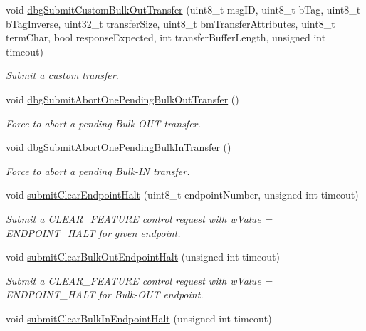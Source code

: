 \begin{DoxyCompactItemize}
void \hyperlink{classmdt_usbtmc_transfer_handler_a363680942d26a4f94cd710ca859f49cc}{dbg\-Submit\-Custom\-Bulk\-Out\-Transfer} (uint8\-\_\-t msg\-I\-D, uint8\-\_\-t b\-Tag, uint8\-\_\-t b\-Tag\-Inverse, uint32\-\_\-t transfer\-Size, uint8\-\_\-t bm\-Transfer\-Attributes, uint8\-\_\-t term\-Char, bool response\-Expected, int transfer\-Buffer\-Length, unsigned int timeout)
\begin{DoxyCompactList}\small\item\em Submit a custom transfer. \end{DoxyCompactList}\item 
void \hyperlink{classmdt_usbtmc_transfer_handler_a1e07eea684c9025f5c601daf25faa2a3}{dbg\-Submit\-Abort\-One\-Pending\-Bulk\-Out\-Transfer} ()
\begin{DoxyCompactList}\small\item\em Force to abort a pending Bulk-\/\-O\-U\-T transfer. \end{DoxyCompactList}\item 
void \hyperlink{classmdt_usbtmc_transfer_handler_addd4a2ec80bb1a1128f993b0fab47e4b}{dbg\-Submit\-Abort\-One\-Pending\-Bulk\-In\-Transfer} ()
\begin{DoxyCompactList}\small\item\em Force to abort a pending Bulk-\/\-I\-N transfer. \end{DoxyCompactList}\item 
void \hyperlink{classmdt_usbtmc_transfer_handler_a275d1b39ebd9391983e227cc51bc0879}{submit\-Clear\-Endpoint\-Halt} (uint8\-\_\-t endpoint\-Number, unsigned int timeout)
\begin{DoxyCompactList}\small\item\em Submit a C\-L\-E\-A\-R\-\_\-\-F\-E\-A\-T\-U\-R\-E control request with w\-Value = E\-N\-D\-P\-O\-I\-N\-T\-\_\-\-H\-A\-L\-T for given endpoint. \end{DoxyCompactList}\item 
void \hyperlink{classmdt_usbtmc_transfer_handler_adecd6b66a99d1a4d49802299ea465ff5}{submit\-Clear\-Bulk\-Out\-Endpoint\-Halt} (unsigned int timeout)
\begin{DoxyCompactList}\small\item\em Submit a C\-L\-E\-A\-R\-\_\-\-F\-E\-A\-T\-U\-R\-E control request with w\-Value = E\-N\-D\-P\-O\-I\-N\-T\-\_\-\-H\-A\-L\-T for Bulk-\/\-O\-U\-T endpoint. \end{DoxyCompactList}\item 
void \hyperlink{classmdt_usbtmc_transfer_handler_a0c75ed4ef7f3e216a1db8e8414fc896d}{submit\-Clear\-Bulk\-In\-Endpoint\-Halt} (unsigned int timeout)

\end{DoxyCompactItemize}
